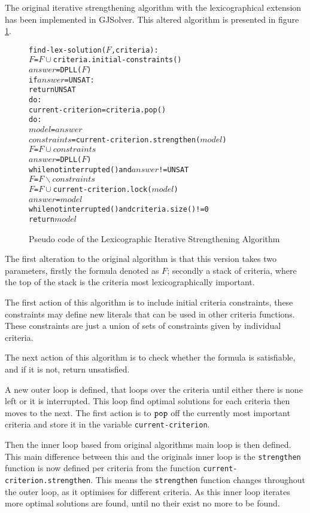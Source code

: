 The original iterative strengthening algorithm with the lexicographical extension has been implemented in GJSolver. 
This altered algorithm is presented in figure \ref{impl.lexstrength}.

\begin{figure}[htp]
\begin{center}
\begin{alltt}
find-lex-solution(\(F\),criteria):
	\(F\) = \(F \cup \) criteria.initial-constraints()
    \(answer\) = DPLL(\(F\))
    if \(answer\) = UNSAT:
        return UNSAT
    do:
        current-criterion = criteria.pop()
        do:
            \(model\) = \(answer\)
            \(constraints\) = current-criterion.strengthen(\(model\))
            \(F\) = \(F \cup constraints\)
            \(answer\) = DPLL(\(F\))
        while not interrupted() and \(answer\) != UNSAT
        \(F\) = \(F \backslash constraints\)
        \(F\) = \(F \cup \) current-criterion.lock(\(model\))
        \(answer\) = \(model\)
    while not interrupted() and criteria.size() != 0
    return \(model\) 
\end{alltt}
  \caption{Pseudo code of the Lexicographic Iterative Strengthening Algorithm}
  \label{impl.lexstrength}
\end{center}
\end{figure}

The first alteration to the original algorithm is that this version takes two parameters, firstly the formula denoted as $F$;
secondly  a stack of criteria, where the top of the stack is the criteria most lexicographically important.

The first action of this algorithm is to include initial criteria constraints,
these constraints may define new literals that can be used in other criteria functions.
These constraints are just a union of sets of constraints given by individual criteria. 

The next action of this algorithm is to check whether the formula is satisfiable,
and if it is not, return unsatisfied.

A new outer loop is defined, that loops over the criteria until either there is none left or it is interrupted.
This loop find optimal solutions for each criteria then moves to the next.
The first action is to $\verb+pop+$ off the currently most important criteria and store it in the variable \verb+current-criterion+.

Then the inner loop based from original algorithms main loop is then defined.
This main difference between this and the originals inner loop is the \verb+strengthen+ function is now defined per criteria from the function \verb+current-criterion.strengthen+.
This means the \verb+strengthen+ function changes throughout the outer loop, as it optimises for different criteria.
As this inner loop iterates more optimal solutions are found, until no their exist no more to be found.


